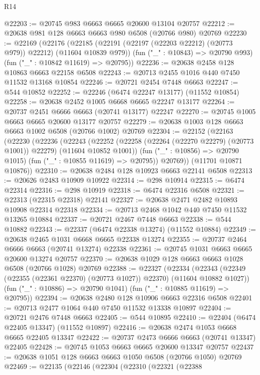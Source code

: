 \begin{lexlean}{R14}
\begin{coremodule}
@22203 := @20745 @983 @6663 @6665 @20600 @13104 @20757
@22212 := @20638 @981 @128 @6663 @6663 @980 @6508 (@20766 @980) @20769
@22230 := @22169
    (@22176
      (@22185 (@22191 (@22197 (@22203 @22212) (@20773 @979)) @22212) (@11604 @10839 @979))
      (fun ("_" : @10843) => @20790 @993)
      (fun ("_" : @10842 @11619) => @20795))
@22236 := @20638 @2458 @128 @10863 @6663 @22158 @6508
@22243 := @20713 @2455 @1016 @440 @7450 @11532 @13168 @10854
@22246 := @20721 @2454 @7448 @6663
@22247 := @544 @10852
@22252 := @22246 (@6474 @22247 @13177) (@11552 @10854)
@22258 := @20638 @2452 @1005 @6668 @6665 @22247 @13177
@22264 := @20737 @2451 @6666 @6663 (@20741 @13177) @22247
@22270 := @20745 @1005 @6663 @6665 @20600 @13177 @20757
@22279 := @20638 @1003 @128 @6663 @6663 @1002 @6508 (@20766 @1002) @20769
@22304 := @22152
    (@22163
      (@22230
        (@22236
          (@22243
            (@22252 (@22258 (@22264 (@22270 @22279) (@20773 @1001)) @22279) (@11604 @10852 @1001))
            (fun ("_" : @10856) => @20790 @1015)
            (fun ("_" : @10855 @11619) => @20795))
          @20769))
      (@11701 @10871 @10876))
@22310 := @20638 @2484 @128 @10923 @6663 @22141 @6508
@22313 := @20626 @2483 @10909 @10922
@22314 := @298 @10914
@22315 := @6474 @22314
@22316 := @298 @10919
@22318 := @6474 @22316 @6508
@22321 := @22313 (@22315 @22318) @22141
@22327 := @20638 @2471 @2482 @10893 @10908 @22314 @22318
@22334 := @20713 @2468 @1042 @440 @7450 @11532 @13265 @10884
@22337 := @20721 @2467 @7448 @6663
@22338 := @544 @10882
@22343 := @22337 (@6474 @22338 @13274) (@11552 @10884)
@22349 := @20638 @2465 @1031 @6668 @6665 @22338 @13274
@22355 := @20737 @2464 @6666 @6663 (@20741 @13274) @22338
@22361 := @20745 @1031 @6663 @6665 @20600 @13274 @20757
@22370 := @20638 @1029 @128 @6663 @6663 @1028 @6508 (@20766 @1028) @20769
@22388 := @22327
    (@22334
      (@22343 (@22349 (@22355 (@22361 @22370) (@20773 @1027)) @22370) (@11604 @10882 @1027))
      (fun ("_" : @10886) => @20790 @1041)
      (fun ("_" : @10885 @11619) => @20795))
@22394 := @20638 @2480 @128 @10906 @6663 @22316 @6508
@22401 := @20713 @2477 @1064 @440 @7450 @11532 @13338 @10897
@22404 := @20721 @2476 @7448 @6663
@22405 := @544 @10895
@22410 := @22404 (@6474 @22405 @13347) (@11552 @10897)
@22416 := @20638 @2474 @1053 @6668 @6665 @22405 @13347
@22422 := @20737 @2473 @6666 @6663 (@20741 @13347) @22405
@22428 := @20745 @1053 @6663 @6665 @20600 @13347 @20757
@22437 := @20638 @1051 @128 @6663 @6663 @1050 @6508 (@20766 @1050) @20769
@22469 := @22135
    (@22146
      (@22304
        (@22310
          (@22321
            (@22388

\end{coremodule}
\end{lexlean}
